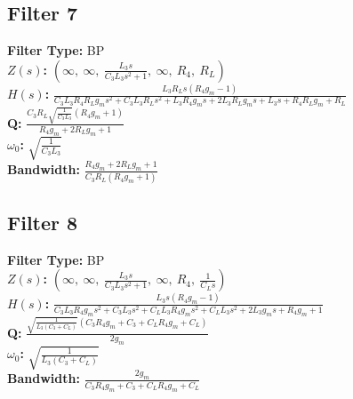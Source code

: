 \documentclass{article}
\begin{document}
\subsection*{Filter 7}
\textbf{Filter Type:} BP \\ 
\textbf{$Z(s)$:} $\left( \infty, \  \infty, \  \frac{L_{3} s}{C_{3} L_{3} s^{2} + 1}, \  \infty, \  R_{4}, \  R_{L}\right)$ \\ 
\textbf{$H(s)$:} $\frac{L_{3} R_{L} s \left(R_{4} g_{m} - 1\right)}{C_{3} L_{3} R_{4} R_{L} g_{m} s^{2} + C_{3} L_{3} R_{L} s^{2} + L_{3} R_{4} g_{m} s + 2 L_{3} R_{L} g_{m} s + L_{3} s + R_{4} R_{L} g_{m} + R_{L}}$ \\ 
\textbf{Q:} $\frac{C_{3} R_{L} \sqrt{\frac{1}{C_{3} L_{3}}} \left(R_{4} g_{m} + 1\right)}{R_{4} g_{m} + 2 R_{L} g_{m} + 1}$ \\ 
\textbf{$\omega_0$:} $\sqrt{\frac{1}{C_{3} L_{3}}}$ \\ 
\textbf{Bandwidth:} $\frac{R_{4} g_{m} + 2 R_{L} g_{m} + 1}{C_{3} R_{L} \left(R_{4} g_{m} + 1\right)}$ \\ 
\subsection*{Filter 8}
\textbf{Filter Type:} BP \\ 
\textbf{$Z(s)$:} $\left( \infty, \  \infty, \  \frac{L_{3} s}{C_{3} L_{3} s^{2} + 1}, \  \infty, \  R_{4}, \  \frac{1}{C_{L} s}\right)$ \\ 
\textbf{$H(s)$:} $\frac{L_{3} s \left(R_{4} g_{m} - 1\right)}{C_{3} L_{3} R_{4} g_{m} s^{2} + C_{3} L_{3} s^{2} + C_{L} L_{3} R_{4} g_{m} s^{2} + C_{L} L_{3} s^{2} + 2 L_{3} g_{m} s + R_{4} g_{m} + 1}$ \\ 
\textbf{Q:} $\frac{\sqrt{\frac{1}{L_{3} \left(C_{3} + C_{L}\right)}} \left(C_{3} R_{4} g_{m} + C_{3} + C_{L} R_{4} g_{m} + C_{L}\right)}{2 g_{m}}$ \\ 
\textbf{$\omega_0$:} $\sqrt{\frac{1}{L_{3} \left(C_{3} + C_{L}\right)}}$ \\ 
\textbf{Bandwidth:} $\frac{2 g_{m}}{C_{3} R_{4} g_{m} + C_{3} + C_{L} R_{4} g_{m} + C_{L}}$ \\ 
\end{document}
